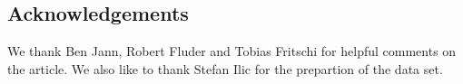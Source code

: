 \documentclass[twoside]{article}\usepackage[]{graphicx}\usepackage[]{color}
\begin{document}
\begin{multicols}{2}







\section{Acknowledgements}

We thank Ben Jann, Robert Fluder and Tobias Fritschi for helpful comments on the article. We also like to thank Stefan Ilic for the prepartion of the data set.



\end{multicols}
\end{document}
